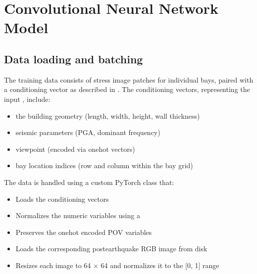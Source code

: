 \documentclass[letterpaper,10pt,english]{sphinxmanual}
\begin{document}
\sphinxstepscope


\chapter{Convolutional Neural Network Model}
\label{\detokenize{model:convolutional-neural-network-model}}\label{\detokenize{model:model-section}}\label{\detokenize{model::doc}}

\section{Data loading and batching}
\label{\detokenize{model:data-loading-and-batching}}
\sphinxAtStartPar
The training data consists of stress image patches for individual bays, paired
with a conditioning vector as described in {\hyperref[\detokenize{data:data-section}]{}}.
The conditioning vectors, representing the input , include:
\begin{itemize}
\item {} 
\sphinxAtStartPar
the building geometry (length, width, height, wall thickness)

\item {} 
\sphinxAtStartPar
seismic parameters (PGA, dominant frequency)

\item {} 
\sphinxAtStartPar
viewpoint (encoded via one\sphinxhyphen{}hot vectors)

\item {} 
\sphinxAtStartPar
bay location indices (row and column within the bay grid)

\end{itemize}

\sphinxAtStartPar
The data is handled using a custom PyTorch  class that:
\begin{itemize}
\item {} 
\sphinxAtStartPar
Loads the conditioning vectors

\item {} 
\sphinxAtStartPar
Normalizes the numeric variables using a 

\item {} 
\sphinxAtStartPar
Preserves the one\sphinxhyphen{}hot encoded POV variables

\item {} 
\sphinxAtStartPar
Loads the corresponding post\sphinxhyphen{}earthquake RGB image from disk

\item {} 
\sphinxAtStartPar
Resizes each image to 64 × 64 and normalizes it to the {[}0, 1{]} range

\end{itemize}
\end{document}
